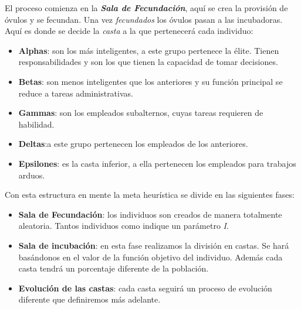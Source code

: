 El proceso comienza en la \textbf{\textit{Sala de Fecundación}}, aquí se crea la provisión de óvulos y se fecundan. Una
vez \textit{fecundados} los óvulos pasan a las incubadoras. Aquí es donde se decide la \textit{casta} a la que
pertenecerá cada individuo:

\begin{itemize}
    \item \textbf{Alphas}: son los más inteligentes, a este grupo pertenece la élite. Tienen responsabilidades y son
    los que tienen la capacidad de tomar decisiones.
    \item \textbf{Betas}: son menos inteligentes que los anteriores y su función principal se reduce a tareas
    administrativas.
    \item \textbf{Gammas}: son los empleados subalternos, cuyas tareas requieren de habilidad.
    \item \textbf{Deltas}:a este grupo pertenecen los empleados de los anteriores.
    \item \textbf{Epsilones}: es la casta inferior, a ella pertenecen los empleados para trabajos arduos.
\end{itemize}

Con esta estructura en mente la meta heurística se divide en las siguientes fases:

\begin{itemize}
    \item \textbf{Sala de Fecundación}: los individuos son creados de manera totalmente aleatoria. Tantos individuos
    como indique un parámetro \textit{I}.
    \item \textbf{Sala de incubación}: en esta fase realizamos la división en castas. Se hará basándonos en el valor de
    la función objetivo del individuo. Además cada casta tendrá un porcentaje diferente de la población.
    \item \textbf{Evolución de las castas}: cada casta seguirá un proceso de evolución diferente que definiremos más
    adelante.
\end{itemize}


